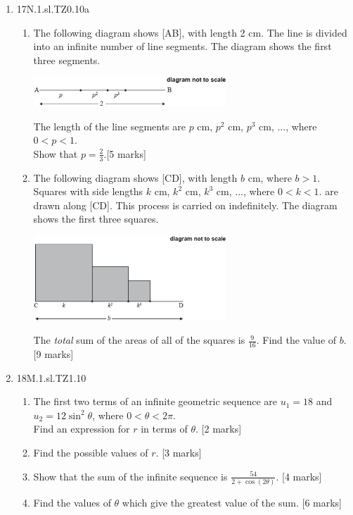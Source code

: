 \documentclass[12pt, twoside]{article}
\begin{document}
\begin{enumerate}
\item 17N.1.sl.TZ0.10a
\begin{enumerate}
  \item The following diagram shows [AB], with length 2 cm. The line is divided into an infinite number of line segments. The diagram shows the first three segments.
  \begin{center}
    \includegraphics[width=0.6\textwidth]{1-1-P1_Algebra-14a.png}
  \end{center}
  The length of the line segments are $p$ cm, $p^2$ cm, $p^3$ cm, ..., where $0<p<1$.\\
  Show that $p=\frac{2}{3}$.[5 marks]
  \item The following diagram shows [CD], with length $b$ cm, where $b>1$. Squares with side lengths $k$ cm, $k^2$ cm, $k^3$ cm, ..., where $0<k<1$. are drawn along [CD]. This process is carried on indefinitely. The diagram shows the first three squares.
  \begin{center}
    \includegraphics[width=0.6\textwidth]{1-1-P1_Algebra-14b.png}
  \end{center}
  The \emph{total} sum of the areas of all of the squares is $\frac{9}{16}$. Find the value of $b$. [9 marks]
\end{enumerate}

\item 18M.1.sl.TZ1.10
\begin{enumerate}
  \item The first two terms of an infinite geometric sequence are $u_1 =18$ and $u_2=12 \sin^2 \theta$, where $0< \theta < 2\pi$.\\
  Find an expression for $r$ in terms of $\theta$. [2 marks]
  \item Find the possible values of $r$. [3 marks]
  \item Show that the sum of the infinite sequence is $\frac{54}{2+ \cos (2\theta)}$. [4 marks]
  \item Find the values of $\theta$ which give the greatest value of the sum. [6 marks]
\end{enumerate}


  \newpage




\end{enumerate}
\end{document}
